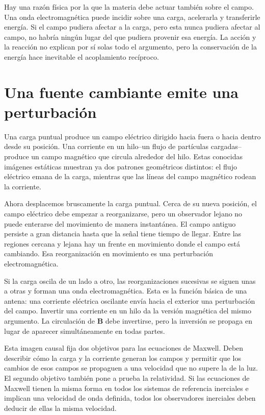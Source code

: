 Hay una razón física por la que la materia debe actuar también sobre el campo. Una onda electromagnética puede incidir sobre una carga, acelerarla y transferirle energía. Si el campo pudiera afectar a la carga, pero esta nunca pudiera afectar al campo, no habría ningún lugar del que pudiera provenir esa energía. La acción y la reacción no explican por sí solas todo el argumento, pero la conservación de la energía hace inevitable el acoplamiento recíproco.

\section{Una fuente cambiante emite una perturbación}

Una carga puntual produce un campo eléctrico dirigido hacia fuera o hacia dentro desde su posición. Una corriente en un hilo--un flujo de partículas cargadas--produce un campo magnético que circula alrededor del hilo. Estas conocidas imágenes estáticas muestran ya dos patrones geométricos distintos: el flujo eléctrico emana de la carga, mientras que las líneas del campo magnético rodean la corriente.

Ahora desplacemos bruscamente la carga puntual. Cerca de su nueva posición, el campo eléctrico debe empezar a reorganizarse, pero un observador lejano no puede enterarse del movimiento de manera instantánea. El campo antiguo persiste a gran distancia hasta que la señal tiene tiempo de llegar. Entre las regiones cercana y lejana hay un frente en movimiento donde el campo está cambiando. Esa reorganización en movimiento es una perturbación electromagnética.

Si la carga oscila de un lado a otro, las reorganizaciones sucesivas se siguen unas a otras y forman una onda electromagnética. Esta es la función básica de una antena: una corriente eléctrica oscilante envía hacia el exterior una perturbación del campo. Invertir una corriente en un hilo da la versión magnética del mismo argumento. La circulación de \(\mathbf B\) debe invertirse, pero la inversión se propaga en lugar de aparecer simultáneamente en todas partes.

Esta imagen causal fija dos objetivos para las ecuaciones de Maxwell. Deben describir cómo la carga y la corriente generan los campos y permitir que los cambios de esos campos se propaguen a una velocidad que no supere la de la luz. El segundo objetivo también pone a prueba la relatividad. Si las ecuaciones de Maxwell tienen la misma forma en todos los sistemas de referencia inerciales e implican una velocidad de onda definida, todos los observadores inerciales deben deducir de ellas la misma velocidad.

